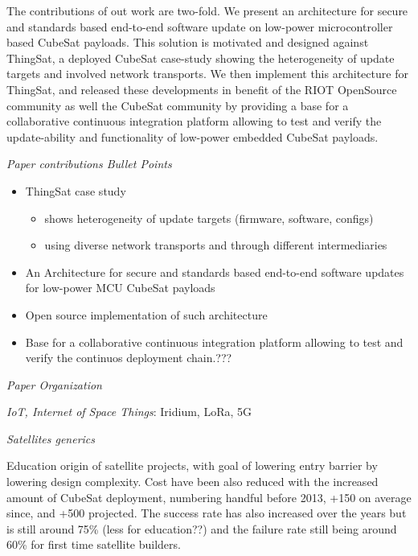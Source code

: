 The contributions of out work are two-fold. We present an architecture for secure
and standards based end-to-end software update on low-power microcontroller based
CubeSat payloads. This solution is motivated and designed against ThingSat, a
deployed CubeSat case-study showing the heterogeneity of update targets and
involved network transports. We then implement this architecture for ThingSat,
and released these developments in benefit of the RIOT OpenSource community
as well the CubeSat community by providing a base for a collaborative continuous
integration platform allowing to test and verify the update-ability and functionality
of low-power embedded CubeSat payloads.

\textit{Paper contributions Bullet Points}
\begin{itemize}
    \item ThingSat case study
    \begin{itemize}
        \item shows heterogeneity of update targets (firmware, software, configs)
        \item using diverse network transports and through different intermediaries
    \end{itemize}
    \item An Architecture for secure and standards based end-to-end software updates
          for low-power MCU CubeSat payloads
    \item Open source implementation of such architecture
    \item Base for a collaborative continuous integration platform allowing to
          test and verify the continuos deployment chain.???
\end{itemize}

\textit{Paper Organization}

\iffalse

\textit{IoT, Internet of Space Things}: Iridium, LoRa, 5G

\textit{Satellites generics}

Education origin of satellite projects, with goal of lowering entry barrier by
lowering design complexity. Cost have been also reduced with the increased
amount of CubeSat deployment, numbering handful before 2013, +150 on average since,
and +500 projected. The success rate has also increased over the years but is still
around 75\%\cite{villela2019towards1000} (less for education??) and the failure
rate still being around 60\% for first time satellite builders\cite{Holliday2019PyCubed}.


